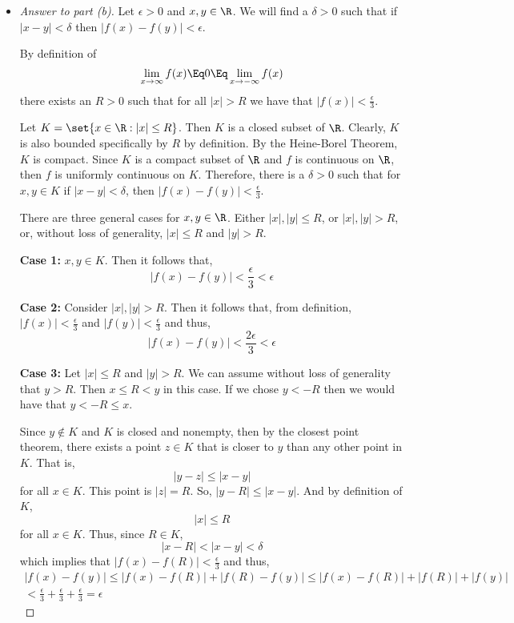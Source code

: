 \documentclass[10pt,twoside]{article}
\begin{document}
\begin{itemize}
\begin{itemize}
        \newpage
        
        \item\begin{proof}[Answer to part (b)]
        Let $\epsilon > 0$ and $x,y\in \R$. We will find a $\delta >0$ such that if $|x-y|<\delta$ then $|f(x) - f(y)|<\epsilon$.
        
        By definition of \[\lim_{x \to \infty} f(x)
        \Eq 0
        \Eq \lim_{x \to -\infty} f(x)\]
        there exists an $R>0$ such that for all $|x|>R$ we have that $|f(x)| < \frac{\epsilon}{3}$.
        
         Let $K = \set{x\in\R:|x|\leq R}$. Then $K$ is a closed subset of $\R$. Clearly, $K$ is also bounded specifically by $R$ by definition. By the Heine-Borel Theorem, $K$ is compact. Since $K$ is a compact subset of $\R$ and $f$ is continuous on $\R$, then $f$ is uniformly continuous on $K$. Therefore, there is a $\delta >0$ such that for $x,y\in K$ if $|x-y|<\delta$, then $|f(x) - f(y)|<\frac{\epsilon}{3}$.\smallskip
        
        There are three general cases for $x,y\in \R$. Either $|x|,|y|\leq R$, or $|x|,|y|> R$, or, without loss of generality, $|x|\leq R$ and $|y|> R$.\smallskip
        
        \textbf{Case 1:} $x,y\in K$. Then it follows that,
        \[|f(x) - f(y)| < \frac{\epsilon}{3} < \epsilon\]
        
        \textbf{Case 2:} Consider $|x|,|y|>R$. Then it follows that, from definition, $|f(x)| < \frac{\epsilon}{3}$ and $|f(y)| < \frac{\epsilon}{3}$ and thus,
        \[|f(x) - f(y)| < \frac{2\epsilon}{3}<\epsilon\]\smallskip
        
        \textbf{Case 3:} Let $|x|\leq R$ and $|y|>R$. We can assume without loss of generality that $y>R$. Then $x\leq R<y$ in this case. If we chose $y<-R$ then we would have that $y<-R\leq x$.
        
        Since $y\not\in K$ and $K$ is closed and nonempty, then by the closest point theorem, there exists a point $z\in K$ that is closer to $y$ than any other point in $K$. That is, 
        \[|y - z|\leq |x-y|\] for all $x\in K$. This point is $|z| = R$. So, $|y - R|\leq |x-y|$. And by definition of $K$, 
        \[|x|\leq R\] for all $x\in K$. Thus, since $R\in K$,
        \[|x - R|< |x - y| < \delta\]
        which implies that $|f(x) - f(R)| < \frac{\epsilon}{3}$ and thus,
        \begin{gather*}
            |f(x) - f(y)| \leq |f(x) - f(R)| + |f(R) - f(y)| \leq |f(x) - f(R)| + |f(R)| + |f(y)| \\
             < \frac{\epsilon}{3} + \frac{\epsilon}{3} + \frac{\epsilon}{3} = \epsilon
        \end{gather*}
        \smallskip
        

\end{proof}
\end{itemize}
\end{itemize}
\end{document}
